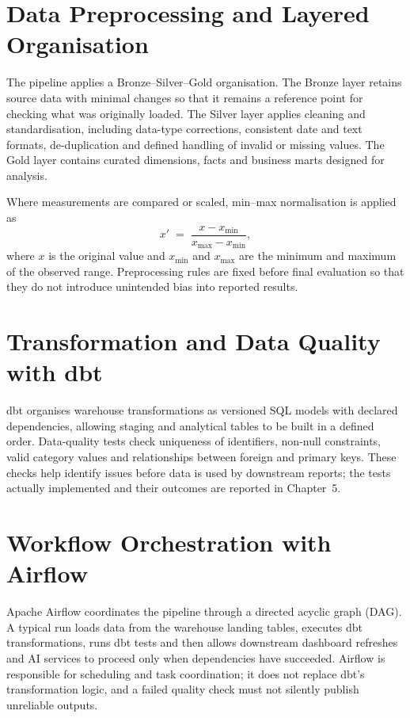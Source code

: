 \documentclass[12pt,a4paper]{report}
\begin{document}
\section{Data Preprocessing and Layered Organisation}
The pipeline applies a Bronze--Silver--Gold organisation. The Bronze layer retains source data with minimal changes so that it remains a reference point for checking what was originally loaded. The Silver layer applies cleaning and standardisation, including data-type corrections, consistent date and text formats, de-duplication and defined handling of invalid or missing values. The Gold layer contains curated dimensions, facts and business marts designed for analysis.

Where measurements are compared or scaled, min--max normalisation is applied as
\begin{equation*}
x' \;=\; \frac{x - x_{\min}}{x_{\max} - x_{\min}},
\end{equation*}
where $x$ is the original value and $x_{\min}$ and $x_{\max}$ are the minimum and maximum of the observed range. Preprocessing rules are fixed before final evaluation so that they do not introduce unintended bias into reported results.

\section{Transformation and Data Quality with dbt}
dbt organises warehouse transformations as versioned SQL models with declared dependencies, allowing staging and analytical tables to be built in a defined order. Data-quality tests check uniqueness of identifiers, non-null constraints, valid category values and relationships between foreign and primary keys. These checks help identify issues before data is used by downstream reports; the tests actually implemented and their outcomes are reported in Chapter~5.

\section{Workflow Orchestration with Airflow}
Apache Airflow coordinates the pipeline through a directed acyclic graph (DAG). A typical run loads data from the warehouse landing tables, executes dbt transformations, runs dbt tests and then allows downstream dashboard refreshes and AI services to proceed only when dependencies have succeeded. Airflow is responsible for scheduling and task coordination; it does not replace dbt's transformation logic, and a failed quality check must not silently publish unreliable outputs.
\end{document}
